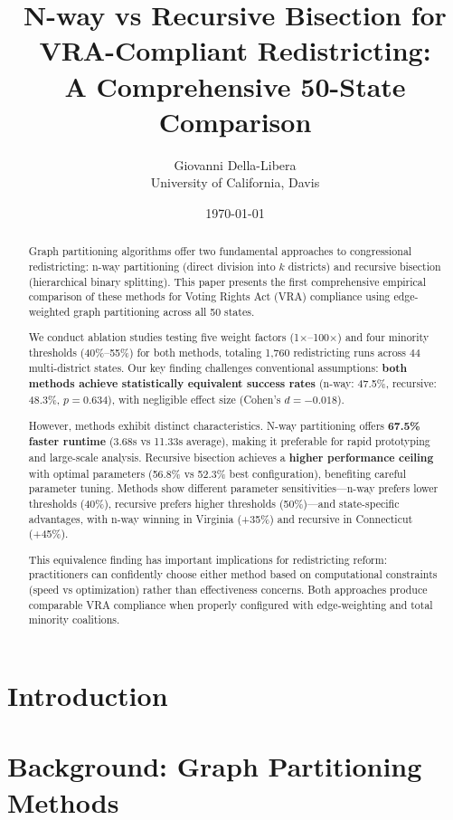 \documentclass[12pt]{article}
\title{N-way vs Recursive Bisection for VRA-Compliant Redistricting:\\
A Comprehensive 50-State Comparison}
\author{Giovanni Della-Libera\\
University of California, Davis}
\date{\today}
\begin{document}
\maketitle

\begin{abstract}
Graph partitioning algorithms offer two fundamental approaches to congressional redistricting: n-way partitioning (direct division into $k$ districts) and recursive bisection (hierarchical binary splitting). This paper presents the first comprehensive empirical comparison of these methods for Voting Rights Act (VRA) compliance using edge-weighted graph partitioning across all 50 states.

We conduct ablation studies testing five weight factors (1$\times$--100$\times$) and four minority thresholds (40\%--55\%) for both methods, totaling 1,760 redistricting runs across 44 multi-district states. Our key finding challenges conventional assumptions: \textbf{both methods achieve statistically equivalent success rates} (n-way: 47.5\%, recursive: 48.3\%, $p=0.634$), with negligible effect size (Cohen's $d=-0.018$).

However, methods exhibit distinct characteristics. N-way partitioning offers \textbf{67.5\% faster runtime} (3.68s vs 11.33s average), making it preferable for rapid prototyping and large-scale analysis. Recursive bisection achieves a \textbf{higher performance ceiling} with optimal parameters (56.8\% vs 52.3\% best configuration), benefiting careful parameter tuning. Methods show different parameter sensitivities—n-way prefers lower thresholds (40\%), recursive prefers higher thresholds (50\%)—and state-specific advantages, with n-way winning in Virginia (+35\%) and recursive in Connecticut (+45\%).

This equivalence finding has important implications for redistricting reform: practitioners can confidently choose either method based on computational constraints (speed vs optimization) rather than effectiveness concerns. Both approaches produce comparable VRA compliance when properly configured with edge-weighting and total minority coalitions.
\end{abstract}

\section{Introduction}


\section{Background: Graph Partitioning Methods}

\end{document}
